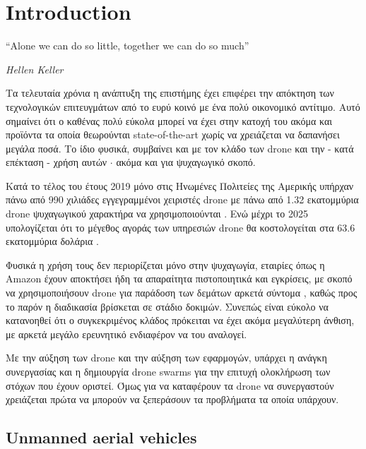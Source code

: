 \chapter{Introduction} %
\label{chap:Chapter1}  %
\epigraph{``Alone we can do so little, together we can do so much” }{\textit{Hellen Keller}}

Τα τελευταία χρόνια η ανάπτυξη της επιστήμης έχει επιφέρει την απόκτηση των 
τεχνολογικών επιτευγμάτων από το ευρύ κοινό με ένα πολύ οικονομικό αντίτιμο. Αυτό σημαίνει
ότι ο καθένας πολύ εύκολα μπορεί να έχει στην κατοχή του ακόμα και προϊόντα τα οποία θεωρούνται 
state-of-the-art χωρίς να χρειάζεται να δαπανήσει μεγάλα ποσά. 
Το ίδιο φυσικά, συμβαίνει και με τον κλάδο των drone και την - κατά επέκταση - χρήση αυτών $\cdot$ ακόμα και 
για ψυχαγωγικό σκοπό.  

Κατά το τέλος του έτους 2019 μόνο στις Ηνωμένες Πολιτείες της Αμερικής υπήρχαν πάνω από 
990 χιλιάδες εγγεγραμμένοι χειριστές drone με πάνω από 1.32 εκατομμύρια drone ψυχαγωγικού 
χαρακτήρα να χρησιμοποιούνται \cite{2019-drone-statistic}. Ενώ μέχρι το 2025 υπολογίζεται 
ότι το μέγεθος αγοράς των υπηρεσιών drone θα κοστολογείται στα 63.6 εκατομμύρια δολάρια \cite{expected-drone-market}.

Φυσικά η χρήση τους δεν περιορίζεται μόνο στην ψυχαγωγία, εταιρίες όπως η Amazon έχουν 
αποκτήσει ήδη τα απαραίτητα πιστοποιητικά και εγκρίσεις, με σκοπό να 
χρησιμοποιήσουν drone για παράδοση των δεμάτων αρκετά σύντομα \cite{amazon-drones}, καθώς προς το παρόν
η διαδικασία βρίσκεται σε στάδιο δοκιμών. 
Συνεπώς είναι εύκολο να κατανοηθεί ότι ο συγκεκριμένος κλάδος πρόκειται να έχει ακόμα μεγαλύτερη 
άνθιση, με αρκετά μεγάλο ερευνητικό ενδιαφέρον να του αναλογεί.   

Με την αύξηση των drone και την αύξηση των εφαρμογών, υπάρχει η ανάγκη συνεργασίας και η δημιουργία drone swarms 
για την επιτυχή ολοκλήρωση των στόχων που έχουν οριστεί. Όμως για να καταφέρουν τα drone
να συνεργαστούν χρειάζεται πρώτα να μπορούν να ξεπεράσουν τα προβλήματα τα οποία υπάρχουν.

\newpage

\section{Unmanned aerial vehicles} \label{sec:Chapter1-1} 

